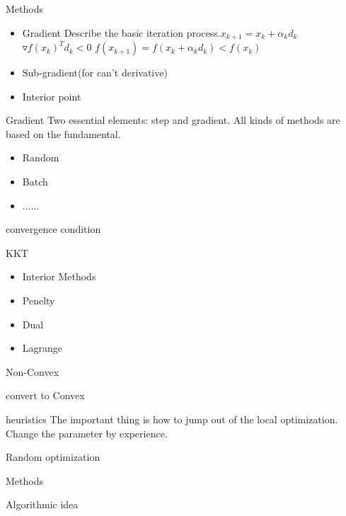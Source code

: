     \begin{frame}{Methods}
      \begin{itemize}
        \item Gradient
        Describe the basic iteration process.$x_{k+1}=x_k+\alpha_k d_k$
        $\triangledown f(x_k)^Td_k < 0$
        $f(x_{k+1}) = f(x_k+\alpha_k d_k) < f(x_k)$
        \item Sub-gradient(for can't derivative)
        \item Interior point
      \end{itemize}
    \end{frame}

    \begin{frame}{Gradient}
      Two essential elements: step and gradient. All kinds of methods are based on the fundamental.
      \begin{itemize}
        \item Random
        \item Batch
        \item ......
      \end{itemize}
      convergence condition
    \end{frame}

\begin{frame}{KKT}
  \begin{itemize}
    \item Interior Methods
    \item Penelty
    \item Dual
    \item Lagrange
  \end{itemize}
\end{frame}

\begin{frame}{Non-Convex}
  \item convert to Convex
  \item heuristics
  The important thing is how to jump out of the local optimization.
  Change the parameter by experience.
\end{frame}

\begin{frame}{Random optimization}
  \item Methods
  \item Algorithmic idea
\end{frame}
